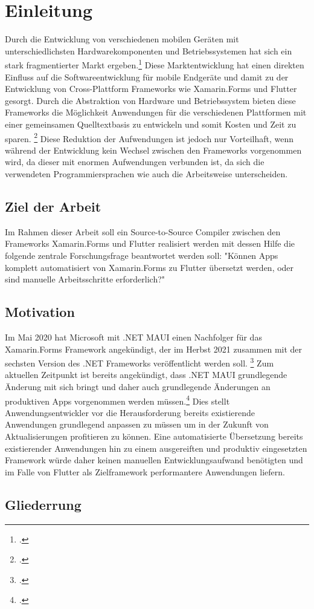 \chapter{Einleitung}
Durch die Entwicklung von verschiedenen mobilen Geräten mit unterschiedlichsten Hardwarekomponenten und Betriebssystemen hat sich ein stark fragmentierter Markt ergeben.\footcite[Vgl.][S. 3]{Joorabchi2016}  Diese Marktentwicklung hat einen direkten Einfluss auf die Softwareentwicklung für mobile Endgeräte und damit zu der Entwicklung von Cross-Plattform Frameworks wie Xamarin.Forms und Flutter gesorgt. Durch die Abstraktion von Hardware und Betriebssystem bieten diese Frameworks die Möglichkeit Anwendungen für die verschiedenen Plattformen mit einer gemeinsamen Quelltextbasis zu entwickeln und somit Kosten und Zeit zu sparen. \footcite[Vgl.][S. 295]{Vollmer2017}
Diese Reduktion der Aufwendungen ist jedoch nur Vorteilhaft, wenn während der Entwicklung kein Wechsel zwischen den Frameworks vorgenommen wird, da dieser mit enormen Aufwendungen verbunden ist, da sich die verwendeten Programmiersprachen wie auch die Arbeitsweise unterscheiden. 
\section{Ziel der Arbeit}
Im Rahmen dieser Arbeit soll ein Source-to-Source Compiler zwischen den Frameworks Xamarin.Forms und Flutter realisiert werden mit dessen Hilfe die folgende zentrale Forschungsfrage beantwortet werden soll: "Können Apps komplett automatisiert von Xamarin.Forms zu Flutter übersetzt werden, oder sind manuelle Arbeitsschritte erforderlich?"
\section{Motivation}
Im Mai 2020 hat Microsoft mit .NET MAUI einen Nachfolger für das Xamarin.Forms Framework angekündigt, der im Herbst 2021 zusammen mit der sechsten Version des .NET Frameworks veröffentlicht werden soll. \footcite[Vgl.][S. 6f]{Ullmann2008} Zum aktuellen Zeitpunkt ist bereits angekündigt, dass .NET MAUI grundlegende Änderung mit sich bringt und daher auch grundlegende Änderungen an produktiven Apps vorgenommen werden müssen.\footcite[Vgl.][S. 6f]{Ullmann2008} Dies stellt Anwendungsentwickler vor die Herausforderung bereits existierende Anwendungen grundlegend anpassen zu müssen um in der Zukunft von Aktualisierungen profitieren zu können. Eine automatisierte Übersetzung bereits existierender Anwendungen hin zu einem ausgereiften und produktiv eingesetzten Framework würde daher keinen manuellen Entwicklungsaufwand benötigten und im Falle von Flutter als Zielframework performantere Anwendungen liefern.
\section{Gliederrung}
